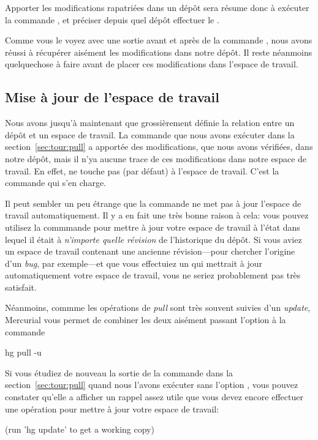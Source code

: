 Apporter les modifications rapatriées dans un dépôt sera résume donc
à exécuter la commande , et préciser depuis quel dépôt 
effectuer le .

Comme vous le voyez avec une sortie avant et après de la commande
, nous avons réussi à récupérer aisément les modifications
dans notre dépôt. Il reste néanmoins quelquechose à faire avant de
placer ces modifications dans l'espace de travail.

\subsection{Mise à jour de l'espace de travail}

Nous avons jusqu'à maintenant que grossièrement définie la relation 
entre un dépôt et un espace de travail. La commande  que
nous avons exécuter dans la section~\ref{sec:tour:pull} a apportée
des modifications, que nous avons vérifiées, dans notre dépôt, mais
il n'ya aucune trace de ces modifications dans notre espace de travail.
En effet,  ne touche pas (par défaut) à l'espace de 
travail. C'est la commande  qui s'en charge.

Il peut sembler un peu étrange que la commande  ne met
pas à jour l'espace de travail automatiquement. Il y a en fait une
très bonne raison à cela: vous pouvez utilisez la commmande 
 pour mettre à jour votre espace de travail à l'état
dans lequel il était à \emph{n'importe quelle révision} de l'historique
du dépôt. Si vous aviez un espace de travail contenant une ancienne
révision---pour chercher l'origine d'un \textit{bug}, par exemple---et
que vous effectuiez un  qui mettrait à jour automatiquement
votre espace de travail, vous ne seriez probablement pas très satisfait.

Néanmoins, commme les opérations de \textit{pull} sont très souvent
suivies d'un \textit{update}, Mercurial vous permet de combiner les
deux aisément passant l'option  à la commande 
\begin{codesample2}
  hg pull -u
\end{codesample2}

Si vous étudiez de nouveau la sortie de la commande  dans
la section~\ref{sec:tour:pull} quand nous l'avons exécuter sans l'option
, vous pouvez constater qu'elle a afficher un rappel assez
utile que vous devez encore effectuer une opération pour mettre à jour
votre espace de travail:
\begin{codesample2}
  (run 'hg update' to get a working copy)
\end{codesample2}

